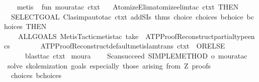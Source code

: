 \begin{isabellebody}
%
\isadelimproof
\ \ %
\endisadelimproof
%
\isatagproof
{}\isamarkupfalse%
\ metis{\isacharplus}{\kern0pt}%
\endisatagproof
{\isafoldproof}%
%
\isadelimproof
\isanewline
%
\endisadelimproof
%
\isadelimML
\isanewline
%
\endisadelimML
%
\isatagML
{}\isamarkupfalse%
\ {\isacartoucheopen}\isanewline
fun\ moura{\isacharunderscore}{\kern0pt}tac\ ctxt\ {\isacharequal}{\kern0pt}\isanewline
\ \ Atomize{\isacharunderscore}{\kern0pt}Elim{\isachardot}{\kern0pt}atomize{\isacharunderscore}{\kern0pt}elim{\isacharunderscore}{\kern0pt}tac\ ctxt\ THEN{\isacharprime}{\kern0pt}\isanewline
\ \ SELECT{\isacharunderscore}{\kern0pt}GOAL\ {\isacharparenleft}{\kern0pt}Clasimp{\isachardot}{\kern0pt}auto{\isacharunderscore}{\kern0pt}tac\ {\isacharparenleft}{\kern0pt}ctxt\ addSIs\ {\isacharat}{\kern0pt}{\isacharbraceleft}{\kern0pt}thms\ choice\ choices\ bchoice\ bchoices{\isacharbraceright}{\kern0pt}{\isacharparenright}{\kern0pt}\ THEN\isanewline
\ \ \ \ ALLGOALS\ {\isacharparenleft}{\kern0pt}Metis{\isacharunderscore}{\kern0pt}Tactic{\isachardot}{\kern0pt}metis{\isacharunderscore}{\kern0pt}tac\ {\isacharparenleft}{\kern0pt}take\ {}\ ATP{\isacharunderscore}{\kern0pt}Proof{\isacharunderscore}{\kern0pt}Reconstruct{\isachardot}{\kern0pt}partial{\isacharunderscore}{\kern0pt}type{\isacharunderscore}{\kern0pt}encs{\isacharparenright}{\kern0pt}\isanewline
\ \ \ \ \ \ \ \ ATP{\isacharunderscore}{\kern0pt}Proof{\isacharunderscore}{\kern0pt}Reconstruct{\isachardot}{\kern0pt}default{\isacharunderscore}{\kern0pt}metis{\isacharunderscore}{\kern0pt}lam{\isacharunderscore}{\kern0pt}trans\ ctxt\ {\isacharbrackleft}{\kern0pt}{\isacharbrackright}{\kern0pt}\ ORELSE{\isacharprime}{\kern0pt}\isanewline
\ \ \ \ \ \ blast{\isacharunderscore}{\kern0pt}tac\ ctxt{\isacharparenright}{\kern0pt}{\isacharparenright}{\kern0pt}\isanewline
{\isacartoucheclose}\isanewline
\isanewline
{}\isamarkupfalse%
\ moura\ {\isacharequal}{\kern0pt}\ {\isacartoucheopen}\isanewline
\ \ Scan{\isachardot}{\kern0pt}succeed\ {\isacharparenleft}{\kern0pt}SIMPLE{\isacharunderscore}{\kern0pt}METHOD{\isacharprime}{\kern0pt}\ o\ moura{\isacharunderscore}{\kern0pt}tac{\isacharparenright}{\kern0pt}\isanewline
{\isacartoucheclose}\ {\isachardoublequoteopen}solve\ skolemization\ goals{\isacharcomma}{\kern0pt}\ especially\ those\ arising\ from\ Z{}\ proofs{\isachardoublequoteclose}%
\endisatagML
{\isafoldML}%
%
\isadelimML
\isanewline
%
\endisadelimML
\isanewline
{}\isamarkupfalse%
\ {\isacharparenleft}{\kern0pt}\ choices\ bchoices%

\end{isabellebody}
